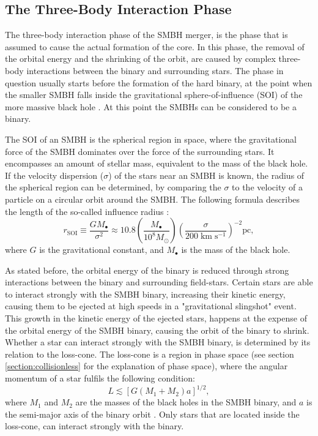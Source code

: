 \documentclass[english, twoside]{HYgradu}
\begin{document}
\subsection{The Three-Body Interaction Phase} \label{section:three-body}

The three-body interaction phase of the SMBH merger, is the phase that is assumed to cause the actual formation of the core. In this phase, the removal of the orbital energy and the shrinking of the orbit, are caused by complex three-body interactions between the binary and surrounding stars. The phase in question usually starts before the formation of the hard binary, at the point when the smaller SMBH falls inside the gravitational sphere-of-influence (SOI) of the more massive black hole \citep{MerrittBook}. At this point the SMBHs can be considered to be a binary. 

The SOI of an SMBH is the spherical region in space, where the gravitational force of the SMBH dominates over the force of the surrounding stars. It encompasses an amount of stellar mass, equivalent to the mass of the black hole. If the velocity dispersion ($\sigma$) of the stars near an SMBH is known, the radius of the spherical region can be determined, by comparing the $\sigma$ to the velocity of a particle on a circular orbit around the SMBH. The following formula describes the length of the so-called influence radius \citep{MerrittBook}:
\begin{equation}
r_\mathrm{SOI} \equiv \frac{GM_\bullet}{\sigma^2} \approx 10.8 \left( \frac{M_\bullet}{10^8 M_\odot} \right) \left( \frac{\sigma}{200 \; \mathrm{km \; s^{-1}}} \right)^{-2} \mathrm{pc},
\end{equation}
where $G$ is the gravitational constant, and $M_\bullet$ is the mass of the black hole. 

As stated before, the orbital energy of the binary is reduced through strong interactions between the binary and surrounding field-stars. Certain stars are able to interact strongly with the SMBH binary, increasing their kinetic energy, causing them to be ejected at high speeds in a "gravitational slingshot" event. This growth in the kinetic energy of the ejected stars, happens at the expense of the orbital energy of the SMBH binary, causing the orbit of the binary to shrink. Whether a star can interact strongly with the SMBH binary, is determined by its relation to the loss-cone. The loss-cone is a region in phase space (see section \ref{section:collisionless} for the explanation of phase space), where the angular momentum of a star fulfils the following condition:
\begin{equation}
L \lesssim \left[ G(M_1 + M_2) a \right]^{1/2}, \label{eq:loss-cone}
\end{equation}
where $M_1$ and $M_2$ are the masses of the black holes in the SMBH binary, and $a$ is the semi-major axis of the binary orbit \citep{BinneyTremaine}. Only stars that are located inside the loss-cone, can interact strongly with the binary.
\end{document}
